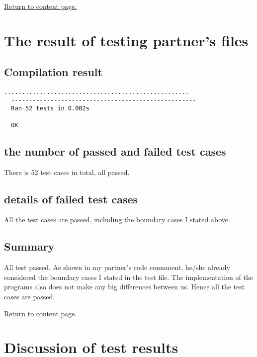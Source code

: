 \documentclass[12pt]{article}
\begin{document}
\vskip 5cm
\hyperlink{toc}{Return to content page.}

\section{The result of testing partner's files}

  \subsection {Compilation result}
  \begin{lstlisting}[frame=single]
  ....................................................
  ----------------------------------------------------
  Ran 52 tests in 0.002s

  OK
  \end{lstlisting}

  \subsection {the number of passed and failed test cases}
  There is 52 test cases in total, all passed.

  \subsection {details of failed test cases}
  All the test cases are passed, including the boundary cases
  I stated above. 

  \subsection {Summary}
  All test passed. As shown in my partner's code conmment, 
  he/she already considered the boundary cases I stated in
  the test file. The implementation of the programs also 
  does not make any big differences between us. Hence all
  the test cases are passed.


\vskip 5cm
\hyperlink{toc}{Return to content page.}

\section{Discussion of test results}
\end{document}
